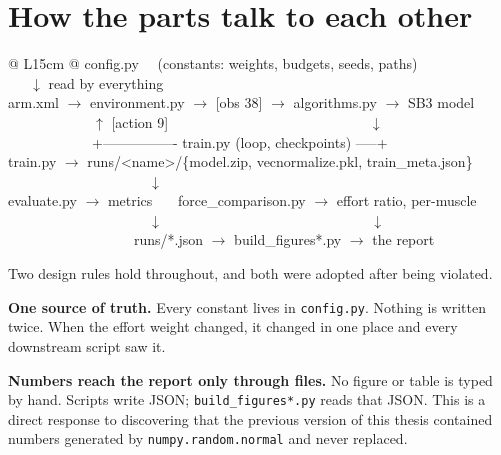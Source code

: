 \section{How the parts talk to each other}

\begin{center}
\begin{tabular}{@{} L{15cm} @{}}
\toprule
\ttfamily\small
config.py \ \ (constants: weights, budgets, seeds, paths)\\
\ttfamily\small
\ \ \ $\downarrow$ read by everything\\[4pt]
\ttfamily\small
arm.xml $\rightarrow$ environment.py $\rightarrow$ [obs 38] $\rightarrow$ algorithms.py $\rightarrow$ SB3 model\\
\ttfamily\small
\ \ \ \ \ \ \ \ \ \ \ \ $\uparrow$ [action 9] \ \ \ \ \ \ \ \ \ \ \ \ \ \ \ \ \ \ \ \ \ \ \ \ \ \ \ \ $\downarrow$\\
\ttfamily\small
\ \ \ \ \ \ \ \ \ \ \ \ +---------------- train.py (loop, checkpoints) -----+\\[4pt]
\ttfamily\small
train.py $\rightarrow$ runs/<name>/\{model.zip, vecnormalize.pkl, train\_meta.json\}\\
\ttfamily\small
\ \ \ \ \ \ \ \ \ \ \ \ \ \ \ \ \ \ \ \ $\downarrow$\\
\ttfamily\small
evaluate.py $\rightarrow$ metrics \ \ \ force\_comparison.py $\rightarrow$ effort ratio, per-muscle\\
\ttfamily\small
\ \ \ \ \ \ \ \ \ \ \ \ \ \ \ \ \ \ \ \ $\downarrow$ \ \ \ \ \ \ \ \ \ \ \ \ \ \ \ \ \ \ \ \ \ \ \ \ \ \ \ \ \ $\downarrow$\\
\ttfamily\small
\ \ \ \ \ \ \ \ \ \ \ \ \ \ \ \ \ \ runs/*.json $\rightarrow$ build\_figures*.py $\rightarrow$ the report\\
\bottomrule
\end{tabular}
\end{center}

\begin{why}
Two design rules hold throughout, and both were adopted after being violated.

\textbf{One source of truth.} Every constant lives in \texttt{config.py}. Nothing
is written twice. When the effort weight changed, it changed in one place and
every downstream script saw it.

\textbf{Numbers reach the report only through files.} No figure or table is typed
by hand. Scripts write JSON; \texttt{build\_figures*.py} reads that JSON. This is
a direct response to discovering that the previous version of this thesis
contained numbers generated by \texttt{numpy.random.normal} and never replaced.
\end{why}

